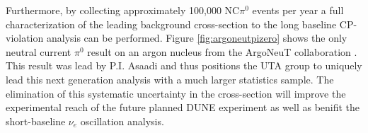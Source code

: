 Furthermore, by collecting approximately 100,000 NC$\pi^{0}$ events per year a full characterization of the leading background cross-section to the long baseline CP-violation analysis can be performed. Figure \ref{fig:argoneutpizero} shows the only neutral current $\pi^0$ result on an argon nucleus from the ArgoNeuT collaboration \cite{}. This result was lead by P.I. Asaadi and thus positions the UTA group to uniquely lead this next generation analysis with a much larger statistics sample. The elimination of this systematic uncertainty in the cross-section will improve the experimental reach of the future planned DUNE experiment as well as benifit the short-baseline $\nu_{e}$ oscillation analysis.
